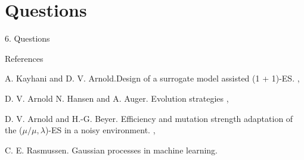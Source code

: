\documentclass{beamer}
\begin{document}
\section{Questions}
\begin{frame}[plain,c]
\begin{center}
\Huge 6. Questions
\end{center}
\end{frame}


\begin{frame}{References}
\begin{thebibliography}{10}

    \bibitem{}
    A. Kayhani and D. V. Arnold.Design of a surrogate model assisted (1 + 1)-ES.
    ,
    
    \bibitem{}
    D. V. Arnold N. Hansen and A. Auger. Evolution strategies
    ,
    
    \bibitem{}
    D. V. Arnold and H.-G. Beyer. Efficiency and mutation strength adaptation of the ($\mu/\mu,\lambda$)-ES in a noisy environment.
    ,
    
    \bibitem{}
    C. E. Rasmussen. Gaussian processes in machine learning.
    
    
    
    \end{thebibliography}


\end{frame}

\end{document}
